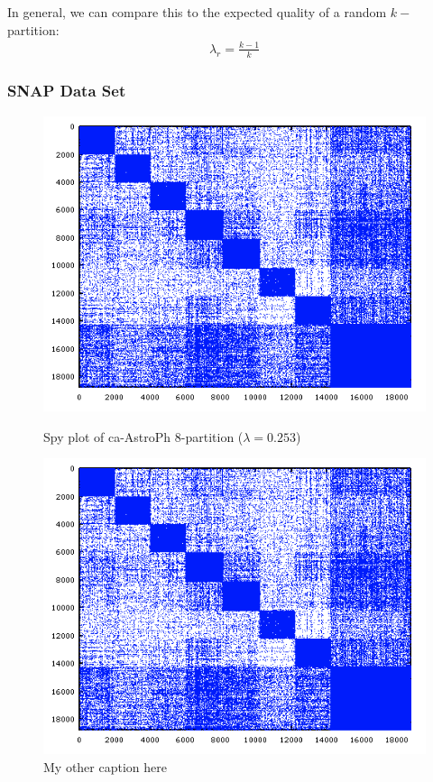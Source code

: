 \documentclass[11pt]{article}
\begin{document}
In general, we can compare this to the expected quality of a random $k-$partition:
\begin{align}\lambda_r = \frac{k-1}{k} \end{align}



\subsubsection{SNAP Data Set}


\begin{figure}
\centering
\begin{minipage}{.7\textwidth}
  \includegraphics[width=\textwidth]{figures/astroPh8.png}
  \caption{Spy plot of ca-AstroPh 8-partition ($\lambda=0.253$)}
\end{minipage}%
\hfill
\begin{minipage}{.7\textwidth}
  \includegraphics[width=\textwidth]{figures/astroPh8.png}
  \caption{My other caption here}
\end{minipage}
\end{figure}
\end{document}
